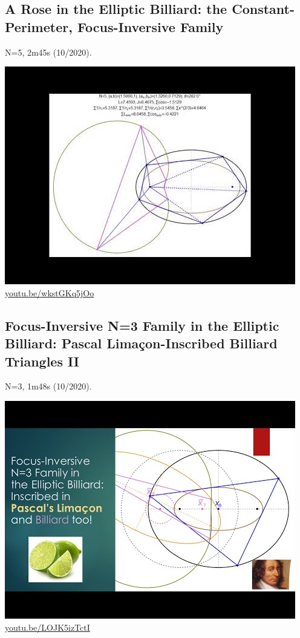 \documentclass[12pt]{amsart}
\begin{document}
\subsection{A Rose in the Elliptic Billiard: the Constant-Perimeter, Focus-Inversive Family}
\label{vid:wkstGKq5jOo}
\noindent N=5, 2m45s (10/2020). 
\begin{center}\includegraphics[width=.5\textwidth]{pics/wkstGKq5jOo.jpg} \\ 
\href{https://youtu.be/wkstGKq5jOo}{\url{youtu.be/wkstGKq5jOo}}\end{center}
% 

\subsection{Focus-Inversive N=3 Family in the Elliptic Billiard: Pascal Limaçon-Inscribed Billiard Triangles II}
\label{vid:LOJK5izTctI}
\noindent N=3, 1m48s (10/2020). 
\begin{center}\includegraphics[width=.5\textwidth]{pics/LOJK5izTctI.jpg} \\ 
\href{https://youtu.be/LOJK5izTctI}{\url{youtu.be/LOJK5izTctI}}\end{center}
% 
\end{document}
